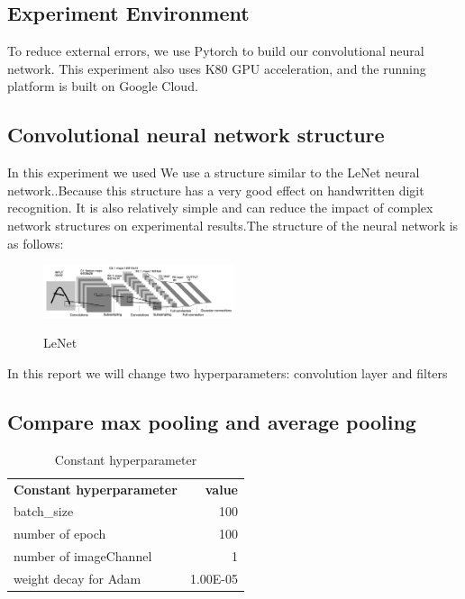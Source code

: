 \documentclass{article}
\begin{document}
\subsection{Experiment  Environment}

To reduce external errors, we use Pytorch to build our convolutional neural network. This experiment also uses K80 GPU acceleration, and the running platform is built on Google Cloud.

\subsection{Convolutional neural network structure}
In this experiment we used We use a structure similar to the LeNet neural network.\cite{LecunY.1998Glat}.Because this structure has a very good effect on handwritten digit recognition. It is also relatively simple and can reduce the impact of complex network structures on experimental results.The structure of the neural network is as follows:
\begin{figure}[H] %
	\centering %
	\includegraphics[width=0.5\textwidth]{./pic/part2/lenet.png} %
	\caption{LeNet} %
	\label{Fig.main2} %
	\cite{LecunY.1998Glat}
\end{figure}

In this report we will change two hyperparameters: convolution layer and filters

\subsection{Compare max pooling and average pooling}
\begin{table}[htbp]
  \centering
  \caption{Constant hyperparameter}
    \begin{tabular}{lr}
    \textbf{Constant hyperparameter} & \ \textbf{value} \\
    batch\_size & 100 \\
    number of epoch & 100 \\
    number of imageChannel & 1 \\
    weight decay for Adam & 1.00E-05 \\
    \end{tabular}%
  \label{tab:addlabel}%
\end{table}%
\end{document}
